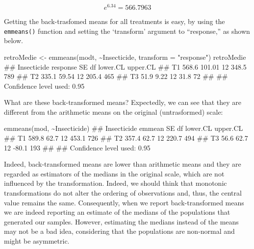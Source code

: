 \documentclass[a4paper,12pt,oneside]{book}
\newenvironment{Shaded}{\begin{snugshade}}{\end{snugshade}}
\newcommand{\SpecialCharTok}[1]{#1}
\newcommand{\StringTok}[1]{#1}
\newcommand{\DocumentationTok}[1]{#1}
\newcommand{\OtherTok}[1]{#1}
\newcommand{\FunctionTok}[1]{#1}
\newcommand{\AttributeTok}[1]{#1}
\newcommand{\NormalTok}[1]{#1}
\begin{document}
\[e^{6.34} = 566.7963\]

Getting the back-trasfomed means for all treatments is easy, by using the \texttt{emmeans()} function and setting the `transform' argument to ``response,'' as shown below.

\begin{Shaded}
\begin{Highlighting}[]
\NormalTok{retroMedie }\OtherTok{\textless{}{-}} \FunctionTok{emmeans}\NormalTok{(modt, }\SpecialCharTok{\textasciitilde{}}\NormalTok{Insecticide, }\AttributeTok{transform =} \StringTok{"response"}\NormalTok{)}
\NormalTok{retroMedie}
\DocumentationTok{\#\#  Insecticide response     SE df lower.CL upper.CL}
\DocumentationTok{\#\#  T1             568.6 101.01 12    348.5      789}
\DocumentationTok{\#\#  T2             335.1  59.54 12    205.4      465}
\DocumentationTok{\#\#  T3              51.9   9.22 12     31.8       72}
\DocumentationTok{\#\# }
\DocumentationTok{\#\# Confidence level used: 0.95}
\end{Highlighting}
\end{Shaded}

What are these back-transformed means? Expectedly, we can see that they are different from the arithmetic means on the original (untrasformed) scale:

\begin{Shaded}
\begin{Highlighting}[]
\FunctionTok{emmeans}\NormalTok{(mod, }\SpecialCharTok{\textasciitilde{}}\NormalTok{Insecticide)}
\DocumentationTok{\#\#  Insecticide emmean   SE df lower.CL upper.CL}
\DocumentationTok{\#\#  T1           589.8 62.7 12    453.1      726}
\DocumentationTok{\#\#  T2           357.4 62.7 12    220.7      494}
\DocumentationTok{\#\#  T3            56.6 62.7 12    {-}80.1      193}
\DocumentationTok{\#\# }
\DocumentationTok{\#\# Confidence level used: 0.95}
\end{Highlighting}
\end{Shaded}

Indeed, back-transformed means are lower than arithmetic means and they are regarded as estimators of the medians in the original scale, which are not influenced by the transformation. Indeed, we should think that monotonic transformations do not alter the ordering of observations and, thus, the central value remains the same. Consequently, when we report back-transformed means we are indeed reporting an estimate of the medians of the populations that generated our samples. However, estimating the medians instead of the means may not be a bad idea, considering that the populations are non-normal and might be asymmetric.
\end{document}
